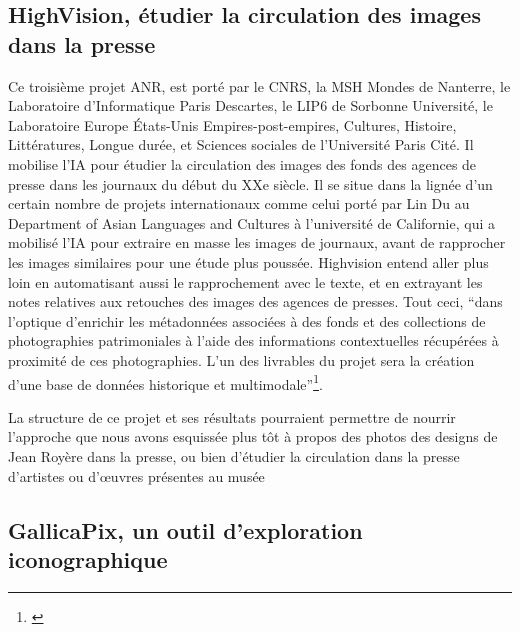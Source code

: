 \subsection{HighVision, étudier la circulation des images dans la presse}

Ce troisième projet ANR, est porté par le CNRS, la MSH Mondes de Nanterre, le Laboratoire d’Informatique Paris Descartes, le LIP6 de Sorbonne Université, le Laboratoire Europe États-Unis Empires-post-empires, Cultures, Histoire, Littératures, Longue durée, et Sciences sociales de l'Université Paris Cité. Il mobilise l’IA pour étudier la circulation des images des fonds des agences de presse dans les journaux du début du XXe siècle. Il se situe dans la lignée d’un certain nombre de projets internationaux comme celui porté par Lin Du au Department of Asian Languages and Cultures à l’université de Californie, qui a mobilisé l’IA pour extraire en masse les images de journaux, avant de rapprocher les images similaires pour une étude plus poussée. Highvision entend aller plus loin en automatisant aussi le rapprochement avec le texte, et en extrayant les notes relatives aux retouches des images des agences de presses. Tout ceci, \enquote{dans l’optique d’enrichir les métadonnées associées à des fonds et des collections de photographies patrimoniales à l’aide des informations contextuelles récupérées à proximité de ces photographies. L’un des livrables du projet sera la création d’une base de données historique et multimodale}\footnote{\cite{noauthor_high_2025}}.

La structure de ce projet et ses résultats pourraient permettre de nourrir l'approche que nous avons esquissée plus tôt à propos des photos des designs de Jean Royère dans la presse, ou bien d'étudier la circulation dans la presse d’artistes ou d’œuvres présentes au musée

\subsection{GallicaPix, un outil d'exploration iconographique}

